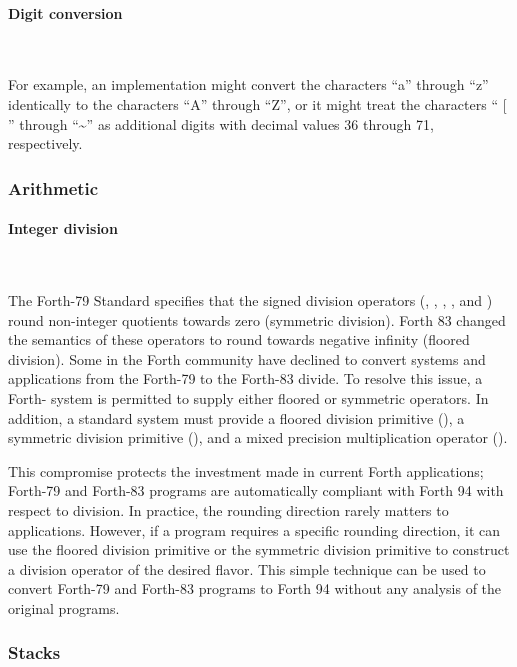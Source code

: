 \paragraph{Digit conversion} ~ %

For example, an implementation might convert the characters ``a''
through ``z'' identically to the characters ``A'' through ``Z'', or
it might treat the characters `` [ '' through ``\~{}'' as additional
digits with decimal values 36 through 71, respectively.


\subsubsection{Arithmetic} %

\paragraph{Integer division} ~ %

The Forth-79 Standard specifies that the signed division operators
(\word{/}, , , , and \word{*/})
round non-integer quotients towards zero (symmetric division).
Forth 83 changed the semantics of these operators to round towards
negative infinity (floored division). Some in the Forth community
have declined to convert systems and applications from the Forth-79
to the Forth-83 divide.  To resolve this issue, a Forth-\snapshot{} system
is permitted to supply either floored or symmetric operators. In
addition, a standard system must provide a floored division primitive
(), a symmetric division primitive (), and
a mixed precision multiplication operator ().

This compromise protects the investment made in current Forth
applications; Forth-79 and Forth-83 programs are automatically
compliant with Forth 94 with respect to division. In practice, the
rounding direction rarely matters to applications. However, if a
program requires a specific rounding direction, it can use the
floored division primitive  or the symmetric division
primitive  to construct a division operator of the
desired flavor. This simple technique can be used to convert Forth-79
and Forth-83 programs to Forth 94 without any analysis of the
original programs.


\subsubsection{Stacks} %

